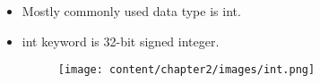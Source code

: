 

\begin{flushleft}
	
	\begin{itemize}
		\item Mostly commonly used data type is int.
		\item int keyword is 32-bit signed integer. 
		\bigskip
		
		\begin{figure}[h!]
			\centering
			\texttt{[image: content/chapter2/images/int.png]}
		\end{figure}		
		
		
	\end{itemize}
	
\end{flushleft}


